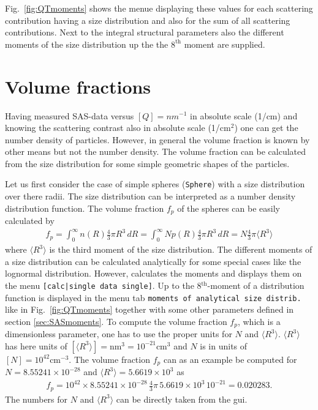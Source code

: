 Fig.\ \ref{fig:QTmoments} shows the \SASfit menue displaying these
values for each scattering contribution having a size distribution
and also for the sum of all scattering contributions. Next to the
integral structural parameters also the different moments of the
size distribution up the the $8^\textrm{th}$ moment are supplied.

\section{Volume fractions}
\label{sec:volumefraction}

Having measured SAS-data versus $[Q]=nm^{-1}$ in absolute scale
(1/cm) and knowing the scattering contrast also in absolute scale
(1/cm$^2$) one can get the number density of particles. However, in
general the volume fraction is known by other means but not the
number density. The volume fraction can be calculated from the size
distribution for some simple geometric shapes of the particles.


Let us first consider the case of simple spheres (\texttt{Sphere})
with a size distribution over there radii. The size distribution can
be interpreted as a number density distribution function. The volume
fraction $f_p$ of the spheres can be easily calculated by
\begin{align}
f_p = \int_0^\infty n(R) \frac{4}{3}\pi R^3 \, dR
    = \int_0^\infty N p(R) \frac{4}{3}\pi R^3 \, dR
    = N \frac{4}{3}\pi \langle R^3 \rangle
\label{eq:fpMomentSphere}
\end{align}
where $\langle R^3 \rangle$ is the third moment of the size
distribution. The different moments of a size distribution can be
calculated analytically for some special cases like the lognormal
distribution. However, \SASfit calculates the moments and displays
them on the menu \verb"[calc|single data single]". Up to the
8$^\textrm{th}$-moment of a distribution function is displayed in
the menu tab \texttt{moments of analytical size distrib.} like in
Fig.\ \ref{fig:QTmoments} together with some other parameters
defined in section \ref{sec:SASmoments}. To compute the volume
fraction $f_p$, which is a dimensionless parameter, one has to use
the proper units for $N$ and $\langle R^3 \rangle$. $\langle R^3
\rangle$ has here units of $\left[\langle R^3
\rangle\right]=\textrm{nm}^3=10^{-21}\textrm{cm}^3$ and $N$ is in
units of $\left[N\right]=10^{42}\textrm{cm}^{-3}$. The volume
fraction $f_p$ can as an example be computed for $N=8.55241\times
10^{-28}$ and $\langle R^3 \rangle=5.6619\times 10^{3}$ as
\begin{align}
f_p=10^{42}\times 8.55241\times 10^{-28} \, \frac{4}{3}\pi \, 5.6619\times 10^{3} \, 10^{-21}=0.020283.
\label{eq:fpMoments_eg}
\end{align}
The numbers for $N$ and $\langle R^3 \rangle$ can be directly taken from the \SASfit gui.

